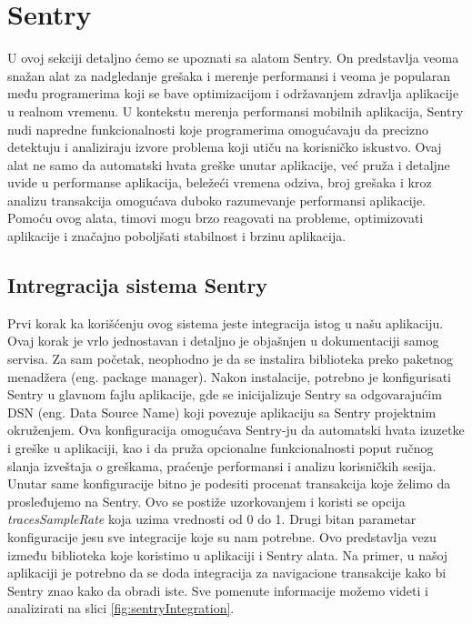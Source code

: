 \documentclass[12pt,oneside]{memoir}
\begin{document}
\section{Sentry}

U ovoj sekciji detaljno ćemo se upoznati sa alatom Sentry. On predstavlja veoma snažan alat za nadgledanje grešaka i merenje performansi i veoma je popularan među programerima koji se bave optimizacijom i održavanjem zdravlja aplikacije u realnom vremenu. U kontekstu merenja performansi mobilnih aplikacija, Sentry nudi napredne funkcionalnosti koje programerima omogućavaju da precizno detektuju i analiziraju izvore problema koji utiču na korisničko iskustvo. Ovaj alat ne samo da automatski hvata greške unutar aplikacije, već pruža i detaljne uvide u performanse aplikacija, beležeći vremena odziva, broj grešaka i kroz analizu transakcija omogućava duboko razumevanje performansi aplikacije. Pomoću ovog alata, timovi mogu brzo reagovati na probleme, optimizovati aplikacije i značajno poboljšati stabilnost i brzinu aplikacija.

\subsection{Intregracija sistema Sentry}

Prvi korak ka korišćenju ovog sistema jeste integracija istog u našu aplikaciju. Ovaj korak je vrlo jednostavan i detaljno je objašnjen u dokumentaciji samog servisa. Za sam početak, neophodno je da se instalira biblioteka preko paketnog menadžera (eng. package manager). Nakon instalacije, potrebno je konfigurisati Sentry u glavnom fajlu aplikacije, gde se inicijalizuje Sentry sa odgovarajućim DSN (eng. Data Source Name) koji povezuje aplikaciju sa Sentry projektnim okruženjem. Ova konfiguracija omogućava Sentry-ju da automatski hvata izuzetke i greške u aplikaciji, kao i da pruža opcionalne funkcionalnosti poput ručnog slanja izveštaja o greškama, praćenje performansi i analizu korisničkih sesija. Unutar same konfiguracije bitno je podesiti procenat transakcija koje želimo da prosleđujemo na Sentry. Ovo se postiže uzorkovanjem i koristi se opcija \textit{tracesSampleRate} koja uzima vrednosti od 0 do 1. Drugi bitan parametar konfiguracije jesu sve integracije koje su nam potrebne. Ovo predstavlja vezu između biblioteka koje koristimo u aplikaciji i Sentry alata. Na primer, u našoj aplikaciji je potrebno da se doda integracija za navigacione transakcije kako bi Sentry znao kako da obradi iste. Sve pomenute informacije možemo videti i analizirati na slici \ref{fig:sentryIntegration}.
\end{document}
